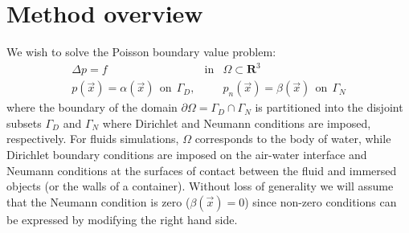 \section{Method overview}

We wish to solve the Poisson boundary value problem:
\begin{eqnarray}
\Delta p=f&\mbox{in}&\Omega\subset\mathbf{R}^3\\
p(\vec{x})=\alpha(\vec{x})\ \ \mbox{on}\ \ \Gamma_D\label{eqn_problem},&&p_n(\vec{x})=\beta(\vec{x})\ \ \mbox{on}\ \ \Gamma_N\nonumber
\end{eqnarray}
where the boundary of the domain $\partial\Omega=\Gamma_D\cap\Gamma_N$ is partitioned into the disjoint subsets $\Gamma_D$ and $\Gamma_N$ where Dirichlet and Neumann conditions are
imposed, respectively. For fluids simulations, $\Omega$ corresponds to the body of water, while
Dirichlet boundary conditions are imposed on the air-water interface and Neumann conditions at the surfaces of contact between the fluid and immersed objects (or the walls of
a container). Without loss of generality we will assume that the Neumann condition is zero ($\beta(\vec{x})$$=$$0$) since non-zero conditions can be expressed by modifying
the right hand side.


